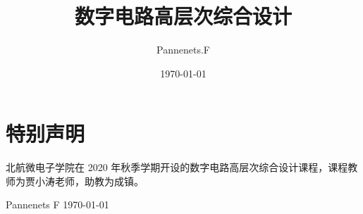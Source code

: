 \documentclass[cn,11pt,chinese,black,simple]{elegantbook}
\title{数字电路高层次综合设计}
\author{Pannenets.F}
\date{\today}
\begin{document}
\maketitle
\frontmatter

\chapter*{特别声明}

北航微电子学院在 2020 年秋季学期开设的数字电路高层次综合设计课程，课程教师为贾小涛老师，助教为成镇。

% 

\begin{flushright}
Pannenets F
\today
\end{flushright}

\tableofcontents

\mainmatter
\end{document}
